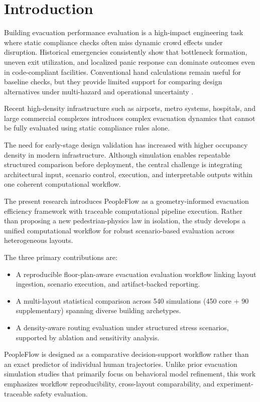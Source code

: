 \documentclass[journal]{IEEEtran}
\begin{document}
\section{Introduction}
Building evacuation performance evaluation is a high-impact engineering task where static compliance checks often miss dynamic crowd effects under disruption. Historical emergencies consistently show that bottleneck formation, uneven exit utilization, and localized panic response can dominate outcomes even in code-compliant facilities. Conventional hand calculations remain useful for baseline checks, but they provide limited support for comparing design alternatives under multi-hazard and operational uncertainty \cite{sfpe,evac_review}.

Recent high-density infrastructure such as airports, metro systems, hospitals, and large commercial complexes introduces complex evacuation dynamics that cannot be fully evaluated using static compliance rules alone.

The need for early-stage design validation has increased with higher occupancy density in modern infrastructure. Although simulation enables repeatable structured comparison before deployment, the central challenge is integrating architectural input, scenario control, execution, and interpretable outputs within one coherent computational workflow.

The present research introduces PeopleFlow as a geometry-informed evacuation efficiency framework with traceable computational pipeline execution. Rather than proposing a new pedestrian-physics law in isolation, the study develops a unified computational workflow for robust scenario-based evaluation across heterogeneous layouts.

The three primary contributions are:
\begin{itemize}
    \item A reproducible floor-plan-aware evacuation evaluation workflow linking layout ingestion, scenario execution, and artifact-backed reporting.
    \item A multi-layout statistical comparison across 540 simulations (450 core + 90 supplementary) spanning diverse building archetypes.
    \item A density-aware routing evaluation under structured stress scenarios, supported by ablation and sensitivity analysis.
\end{itemize}

PeopleFlow is designed as a comparative decision-support workflow rather than an exact predictor of individual human trajectories.
Unlike prior evacuation simulation studies that primarily focus on behavioral model refinement, this work emphasizes workflow reproducibility, cross-layout comparability, and experiment-traceable safety evaluation.
\end{document}

